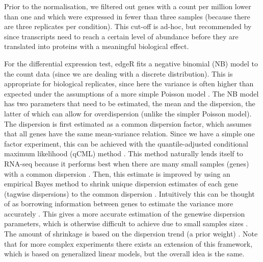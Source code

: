 \documentclass[a4paper,10pt]{article}\usepackage[]{graphicx}\usepackage[]{color}
\begin{document}
Prior to the normalisation, we filtered out genes with a count per million lower than one and which were expressed in fewer than three samples (because there are three replicates per condition). This cut-off is ad-hoc, but recommended by \textcite{chen_edger_2015} since transcripts need to reach a certain level of abundance before they are translated into proteins with a meaningful biological effect.

For the differential expression test, edgeR fits a negative binomial (NB) model to the count data (since we are dealing with a discrete distribution). This is appropriate for biological replicates, since here the variance is often higher than expected under the assumptions of a more simple Poisson model \autocite{robinson_edger_2010}. The NB model has two parameters that need to be estimated, the mean and the dispersion, the latter of which can allow for overdispersion (unlike the simpler Poisson model). The dispersion is first estimated as a common dispersion factor, which assumes that all genes have the same mean-variance relation. Since we have a simple one factor experiment, this can be achieved with the quantile-adjusted conditional maximum likelihood (qCML) method \autocite{robinson_edger_2010}. This method naturally lends itself to RNA-seq because it performs best when there are many small samples (genes) with a common dispersion \autocite{robinson_smallsample_2008}. Then, this estimate is improved by using an empirical Bayes method to shrink unique dispersion estimates of each gene (tagwise dispersions) to the common dispersion \autocite{robinson_moderated_2007}. Intuitively this can be thought of as borrowing information between genes to estimate the variance more accurately \autocite{robinson_edger_2010}. This gives a more accurate estimation of the genewise dispersion parameters, which is otherwise difficult to achieve due to small samples sizes \autocite{soneson_comparison_2013}. The amount of shrinkage is based on the dispersion trend (a prior weight) \autocite{Chen2014}. Note that for more complex experiments there exists an extension of this framework, which is based on generalized linear models, but the overall idea is the same.
\end{document}
